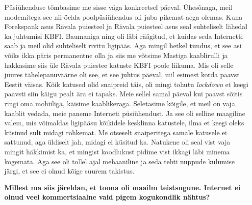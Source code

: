 Püsiühenduse tõmbasime me sisse väga konkreetsel päeval. Ühesõnaga, meil 
modemitega see nii-öelda poolpüsiühendus oli juba pikemat aega olemas. Kuna 
Forekspank asus Rävala puiesteel ja Rävala puiesteel asus seal suhteliselt 
lähedal ka juhtumisi KBFI. Baumaniga ning 
oli läbi räägitud, et kuidas seda Internetti saab ja meil olid  suhteliselt 
rivitu ligipääs. Aga mingil hetkel tundus, et see asi võiks ikka päris 
permanentne olla ja siis me võtsime Mastiga kaablirulli ja 
hakkasime siis üle Rävala puiestee katuste KBFI poole liikuma. Mis oli selle 
juures tähelepanuväärne oli see, et see juhtus päeval, mil esimest korda paavst 
Eestit väisas. Kõik katused olid snaipreid täis, oli mingi tohutu 
\emph{lockdown} et keegi paavsti siin käigu pealt ära ei tapaks. Meie sellel 
samal päeval kui paavst sõitis ringi oma mobiiliga, käisime kaablikeraga. 
Seletasime kõigile, et meil on vaja kaablit vedada, meie paneme Interneti 
püsiühendust. Ja see oli selline maagiline valem, mis  võimaldas ligipääsu 
kõikidele kesklinna katustele, ilma et keegi oleks küsinud sult midagi 
rohkemat. Me otseselt snaiperitega samale katusele ei sattunud, aga üldiselt 
jah, midagi ei küsitud ka. Natukene oli seal vist vaja mingit häkkimist ka, et 
mingist koodlukust pidime vist ikkagi läbi minema kogemata. Aga see oli tollel 
ajal mehaaniline ja seda tehti nuppude kulumise järgi, et see ei olnud kõige 
suurem takistus. 

\textbf{Millest ma siis järeldan, et toona oli maailm teistsugune. Internet ei 
olnud veel kommertsiaalne vaid pigem kogukondlik nähtus?}

